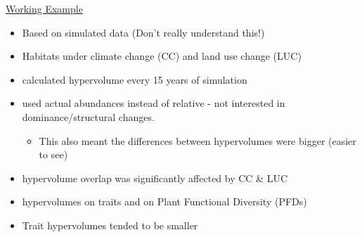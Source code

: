 \begin{itemize}
 \underline{Working Example}
 \begin{itemize}
		 	\item Based on simulated data (Don't really understand this!)
		 	\item Habitats under climate change (CC) and land use change (LUC)
		 	\item calculated hypervolume every 15 years of simulation
		 	\item used actual abundances instead of relative - not interested in dominance/structural changes.
		 	\begin{itemize}
		 		\item This also meant the differences between hypervolumes were bigger (easier to see)
		 	\end{itemize}
		 	\item hypervolume overlap was significantly affected by CC \& LUC
		 	\item hypervolumes on traits and on Plant Functional Diversity (PFDs)
		 	\item Trait hypervolumes tended to be smaller
 \end{itemize}
	\end{itemize}
	 
